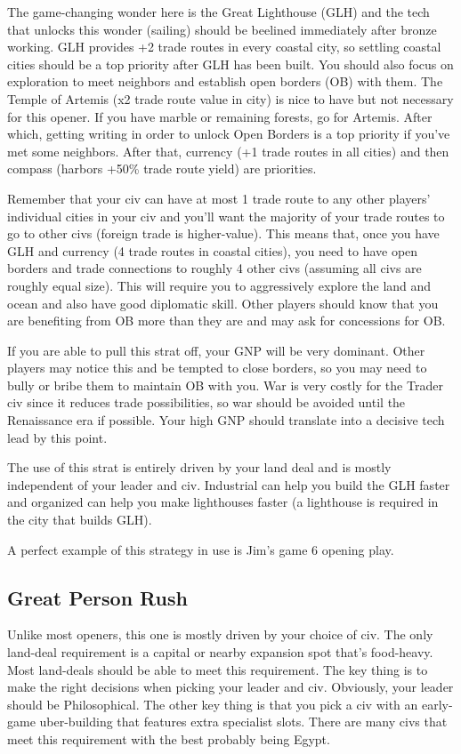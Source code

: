 \documentclass[10pt]{article}
\begin{document}
The game-changing wonder here is the Great Lighthouse (GLH) and the
tech that unlocks this wonder (sailing) should be beelined immediately
after bronze working. GLH provides +2 trade routes in every coastal
city, so settling coastal cities should be a top priority after GLH
has been built. You should also focus on exploration to meet neighbors
and establish open borders (OB) with them.  The Temple of Artemis (x2
trade route value in city) is nice to have but not necessary for this
opener.  If you have marble or remaining forests, go for
Artemis. After which, getting writing in order to unlock Open Borders
is a top priority if you've met some neighbors. After that, currency
(+1 trade routes in all cities) and then compass (harbors +50\% trade
route yield) are priorities.

Remember that your civ can have at most 1 trade route to any other
players' individual cities in your civ and you'll want the majority of
your trade routes to go to other civs (foreign trade is
higher-value). This means that, once you have GLH and currency (4
trade routes in coastal cities), you need to have open borders and
trade connections to roughly 4 other civs (assuming all civs are
roughly equal size). This will require you to aggressively explore the
land and ocean and also have good diplomatic skill. Other players
should know that you are benefiting from OB more than they are and may
ask for concessions for OB.

If you are able to pull this strat off, your GNP will be very
dominant. Other players may notice this and be tempted to close
borders, so you may need to bully or bribe them to maintain OB with
you. War is very costly for the Trader civ since it reduces trade
possibilities, so war should be avoided until the Renaissance era if
possible. Your high GNP should translate into a decisive tech lead by
this point.

The use of this strat is entirely driven by your land deal and is
mostly independent of your leader and civ. Industrial can help you
build the GLH faster and organized can help you make lighthouses
faster (a lighthouse is required in the city that builds GLH).

A perfect example of this strategy in use is Jim's game 6 opening play.

\subsection*{Great Person Rush}

Unlike most openers, this one is mostly driven by your choice of
civ. The only land-deal requirement is a capital or nearby expansion
spot that's food-heavy. Most land-deals should be able to meet this
requirement. The key thing is to make the right decisions when picking
your leader and civ. Obviously, your leader should be
Philosophical. The other key thing is that you pick a civ with an
early-game uber-building that features extra specialist slots. There
are many civs that meet this requirement with the best probably being
Egypt.
\end{document}
